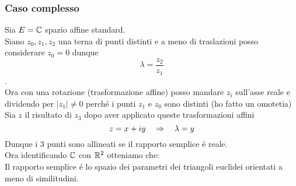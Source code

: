 \subsubsection{Caso complesso}
Sia $E=\mathbb{C}$ spazio affine standard.\\
Siano $z_0,z_1, z_2 $ una terna di punti distinti e  a meno di traslazioni posso considerare $z_0=0$ dunque
$$ \lambda=\frac{z_2}{z_1}$$.\\
Ora con una rotazione (trasformazione affine) posso mandare $z_i$ sull'asse reale e dividendo per $\vert z_1 \vert \neq 0 $ perch\'e i punti $z_1 $ e $z_0$ sono distinti (ho fatto un omotetia)\\
Sia $z$ il risultato di $z_3 $ dopo aver applicato queste trasformazioni affini
$$ z = x+ iy  \quad \Rightarrow \quad \lambda= y $$
Dunque i 3 punti sono allineati se il rapporto semplice \'e reale.\\
Ora identificando $\mathbb{C} $ con $\mathbb{R}^2$ otteniamo che:\\
Il rapporto semplice \'e lo spazio dei parametri dei triangoli euclidei orientati a meno di similitudini.\\
\newpage

